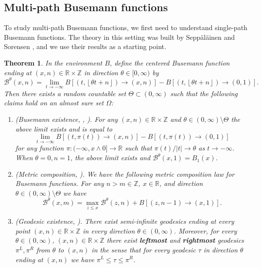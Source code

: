 \documentclass[11pt]{article}
\newcommand{\Z}{\mathbb{Z}}
\newcommand{\R}{\mathbb{R}}
\newcommand{\fl}[1]{{\left\lfloor #1 \right\rfloor}}
\newcommand{\Om}{\Omega}
\newcommand{\cB}{\mathcal{B}}
\newcommand{\X}{\times}
\newcommand{\smin}{\setminus}
\newtheorem{theorem}{Theorem}[section]
\theoremstyle{definition} %
\theoremstyle{remark} %
\begin{document}
\subsection{Multi-path Busemann functions}
\label{S:Busemann-A}

To study multi-path Busemann functions, we first need to understand single-path Busemann functions. The theory in this setting was built by Sepp\"al\"ainen and Sorensen \cite{seppalainen2023busemann, seppalainen2023global}, and we use their results as a starting point. 

\begin{theorem}
	\label{T:sepp-sorensen}
	In the environment $B$, define the centered Busemann function ending at $(x, n) \in \R \X \Z$ in direction $\theta \in [0, \infty)$ by
	\begin{equation}
		\label{E:buseman-brownian-def}
	\cB^\theta(x, n) = \lim_{t \to -\infty} B[(t, \fl{\theta t + n}) \to (x, n)] -  B[( t, \fl{\theta t + n}) \to (0, 1)].
\end{equation}
	Then there exists a random countable set $\Theta \subset (0, \infty)$ such that the following claims hold on an almost sure set $\Om$:
	\begin{enumerate}
		\item (Busemann existence, \cite[Theorem 2.5(i)]{seppalainen2023global}, \cite[Theorem 3.5(viii)]{seppalainen2023busemann}). For any $(x, n) \in \R \X \Z$ and $\theta \in (0, \infty) \setminus \Theta$ the above limit exists and is equal to
		$$
		\lim_{t \to -\infty} B[(t, \pi(t)) \to (x, n)] -  B[(t, \pi(t)) \to (0, 1)]
		$$
		for any function $\pi:(-\infty, x \wedge 0] \to \R$ such that $\pi(t)/|t| \to \theta$ as $t \to -\infty$. When $\theta = 0, n = 1$, the above limit exists and $\cB^\theta(x, 1) = B_1(x)$.
		\item (Metric composition, \cite[Theorem 3.5(vi)]{seppalainen2023busemann}). We have the following metric composition law for Busemann functions. For any $n > m \in \Z$, $x \in \R$, and direction $\theta \in (0, \infty) \smin \Theta$ we have
		$$
		\cB^\theta(x, m) = \max_{z \le x} \cB^\theta(z, n) + B[(z, n - 1) \to (x, 1)].
		$$ 
		\item (Geodesic existence, \cite[Theorem 3.1(i), Theorem 4.3(ii)]{seppalainen2023busemann}). There exist semi-infinite geodesics ending at every point $(x, n) \in \R \X \Z$ in every direction $\theta \in (0,\infty)$. Moreover, for every $\theta \in (0, \infty)$, $(x, n) \in \R \X \Z$ there exist \textbf{leftmost} and \textbf{rightmost} geodesics $\pi^L, \pi^R$ from $\theta$ to $(x, n)$ in the sense that for every geodesic $\tau$ in direction $\theta$ ending at $(x, n)$ we have $\pi^L \le \tau \le \pi^R$. 

\end{enumerate}
\end{theorem}
\end{document}
